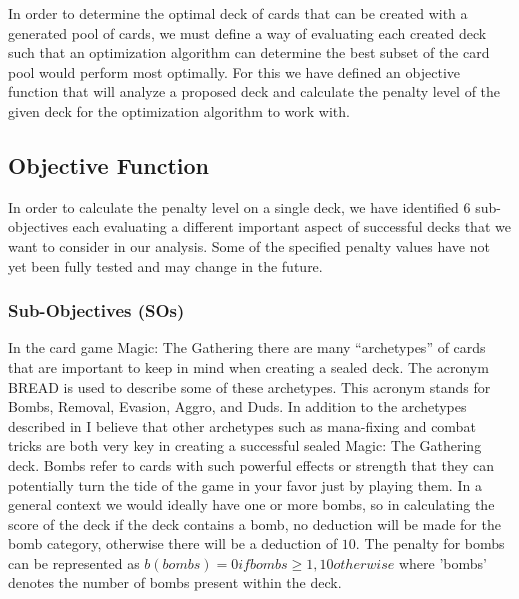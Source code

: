 \documentclass[12pt, letterpaper]{article}
\newcounter{subsubsubsection}[subsubsection]
\begin{document}
In order to determine the optimal deck of cards that can be created with a generated pool of cards, we must define a way
of evaluating each created deck such that an optimization algorithm can determine the best subset of the card pool would
perform most optimally. For this we have defined an objective function that will analyze a proposed deck and calculate
the penalty level of the given deck for the optimization algorithm to work with.

\subsection{Objective Function}

In order to calculate the penalty level on a single deck, we have identified 6 sub-objectives each evaluating a different
important aspect of successful decks that we want to consider in our analysis. Some of the specified penalty values have
not yet been fully tested and may change in the future.

\subsubsection{Sub-Objectives (SOs)}






    In the card game Magic: The Gathering there are many “archetypes” of cards that are important to keep in mind when
creating a sealed deck. The acronym BREAD is used to describe some of these archetypes. This acronym stands for Bombs,
Removal, Evasion, Aggro, and Duds. In addition to the archetypes described in I believe that other archetypes such as
mana-fixing and combat tricks are both very key in creating a successful sealed Magic: The Gathering deck.
Bombs refer to cards with such powerful effects or strength that they can potentially turn the tide of the game in your
favor just by playing them. In a general context we would ideally have one or more bombs, so in calculating the score of
the deck if the deck contains a bomb, no deduction will be made for the bomb category, otherwise there will be a deduction
of $10$. The penalty for bombs can be represented as $b(bombs) = 0 if bombs \ge 1, 10 otherwise$ where 'bombs' denotes the
number of bombs present within the deck.
\end{document}
